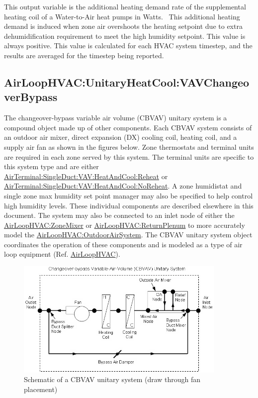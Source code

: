 This output variable is the additional heating demand rate of the supplemental heating coil of a Water-to-Air heat pumps in Watts.~ This additional heating demand is induced when zone air overshoots the heating setpoint due to extra dehumidification requirement to meet the high humidity setpoint. This value is always positive. This value is calculated for each HVAC system timestep, and the results are averaged for the timestep being reported.

\subsection{AirLoopHVAC:UnitaryHeatCool:VAVChangeoverBypass}\label{airloophvacunitaryheatcoolvavchangeoverbypass}

The changeover-bypass variable air volume (CBVAV) unitary system is a compound object made up of other components. Each CBVAV system consists of an outdoor air mixer, direct expansion (DX) cooling coil, heating coil, and a supply air fan as shown in the figures below. Zone thermostats and terminal units are required in each zone served by this system. The terminal units are specific to this system type and are either \hyperref[airterminalsingleductvavheatandcoolreheat]{AirTerminal:SingleDuct:VAV:HeatAndCool:Reheat} or \hyperref[airterminalsingleductvavheatandcoolnoreheat]{AirTerminal:SingleDuct:VAV:HeatAndCool:NoReheat}. A zone humidistat and single zone max humidity set point manager may also be specified to help control high humidity levels. These individual components are described elsewhere in this document. The system may also be connected to an inlet node of either the \hyperref[airloophvaczonemixer]{AirLoopHVAC:ZoneMixer} or \hyperref[airloophvacreturnplenum]{AirLoopHVAC:ReturnPlenum} to more accurately model the \hyperref[airloophvacoutdoorairsystem]{AirLoopHVAC:OutdoorAirSystem}. The CBVAV unitary system object coordinates the operation of these components and is modeled as a type of air loop equipment (Ref. \hyperref[airloophvac]{AirLoopHVAC}).

\begin{figure}[hbtp] %
\centering
\includegraphics[width=0.9\textwidth, height=0.9\textheight, keepaspectratio=true]{media/image308.png}
\caption{Schematic of a CBVAV unitary system (draw through fan placement) \protect \label{fig:schematic-of-a-cbvav-unitary-system-draw}}
\end{figure}

